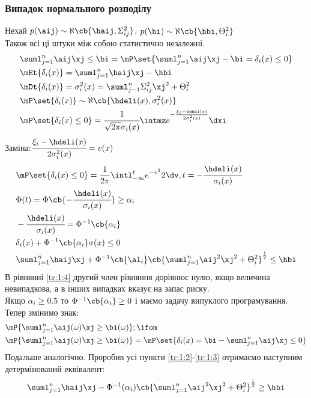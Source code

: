 \subsubsection{Випадок нормального розподілу}\label{tr:1:1}
Нехай $p(\aij)\sim\aleph\cb{\haij,\Sigma_{ij}^2}$, $p(\bi)\sim\aleph\cb{\hbi,\Theta_i^2}$\\
Також всі ці штуки між собою статистично незалежні.\\
\begin{eqnarray}
&{\suml_{j=1}^n\aij\xj\leq\bi} = \mP\set{\suml_{j=1}^n\aij\xj-\bi=\delta_i(x)\leq 0}\\
&\mEt{\delta_i(x)} = \suml_{j=1}^n \haij\xj-\hbi\label{tr:1:2}\\
&\mDt{\delta_i(x)} = \sigma_i^2(x) = \suml_{j-1}^n \Sigma_{ij}^2 \xj^2 + \Theta_i^2\\
&\mP\set{\delta_i(x)}\sim\aleph\cb{\hdeli(x),\sigma_i^2(x)}\\
&\mP\set{\delta_i(x)\leq 0} = \cfrac1{\sqrt{2\pi}\sigma_i(x)} \intmz e^{-\frac{\xi_i - \hdeli(x)}{2\sigma_i^2(x)}}\dxi
\end{eqnarray}
Заміна:$\cfrac{\xi_i - \hdeli(x)}{2\sigma_i^2(x)} = v(x)$\\
\begin{eqnarray}
&\mP\set{\delta_i(x)\leq 0} = \frac1{2\pi} \intl_{-\infty}^t e^{-v^2}2 \dv, t = -\cfrac{\hdeli(x)}{\sigma_i(x)}\\
&\Phi(t) = \Phi\cb{-\cfrac{\hdeli(x)}{\sigma_i(x)}} \geq \alpha_i\\
&-\cfrac{\hdeli(x)}{\sigma_i(x)} =  \Phi^{-1}\cb{\alpha_i}\\
&\delta_i(x)+\Phi^{-1}\cb{\alpha_i}\sigma(x)\leq 0\label{tr:1:3}\\
&\suml_{j=1}^n\haij\xj+\Phi^{-1}\cb{\al_i}\cb{\suml_{j=1}^n \aij^2\xj^2+\Theta^2_i}^{\frac12} \leq\hbi\label{tr:1:4}
\end{eqnarray}
В рівнянні \eqref{tr:1:4} другий член рівняння дорівнює нулю, якщо величина невипадкова, а в інших випадках вказує на запас риску.\\
Якщо $\alpha_i\geq 0.5$ то $\Phi^{-1}\cb{\alpha_i}\geq0$ і маємо задачу випуклого програмування.\\
Тепер змінимо знак:
\begin{eqnarray}
&\mP{\suml_{j=1}^n \aij(\omega)\xj\geq \bi(\omega)};\ifom\\
&\mP{\suml_{j=1}^n \aij(\omega)\xj\geq \bi(\omega)}  = \mP\set{\delta_i(x) = \bi - \suml_{j=1}^n \aij\xj\leq0}
\end{eqnarray}
Подальше аналогічно. Проробив усі пункти \eqref{tr:1:2}-\eqref{tr:1:3} отримаємо наступним детермінований еквівалент:\\
\begin{equation}
\suml_{j=1}^n \haij\xj - \Phi^{-1}(\alpha_i)\cb{\suml_{j=1}^n \aij^2\xj^2+\Theta_i^2}^{\frac12}\geq \hbi
\end{equation}

